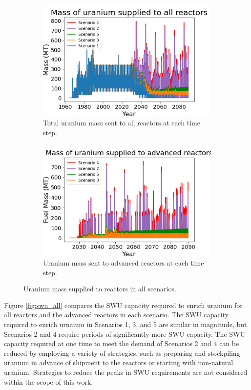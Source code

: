 \begin{figure}
    \centering
    \begin{subfigure}{0.5\textwidth}
        \centering
        \includegraphics[scale=0.5]{../figures/fuelsupply_scenarios_all.png}
        \caption{Total uranium mass sent to all reactors at each time step.}
        \label{fig:totalfuel_all}
    \end{subfigure}
    \hspace{0.8cm}
    \begin{subfigure}{0.5\textwidth}
        \centering
        \includegraphics[scale=0.5]{../figures/advancedRX_fuelsupply_scenarios_2-5.png}
        \caption{Uranium mass sent to advanced reactors at each time step.}
        \label{fig:haleufuel_all}
    \end{subfigure}
    \caption{Uranium mass supplied to reactors in all scenarios.}
    \label{fig:fuel_all}
\end{figure}

Figure \ref{fig:swu_all} compares the \gls{SWU} capacity required to enrich uranium for 
all reactors and the advanced reactors in each scenario. The \gls{SWU} capacity required 
to enrich urnaium in Scenarios 1, 3, and 5 are similar in magnitude, but Scenarios 2 and 4
require periods of significantly more \gls{SWU} capacity. The \gls{SWU} capacity 
required at one time to meet the demand of Scenarios 2 and 4 can be reduced by 
employing a variety of strategies, such as preparing and stockpiling uranium in advance 
of shipment to the reactors or starting with non-natural uranium. Strategies to reduce 
the peaks in \gls{SWU} requirements are not considered within the scope of this work. 

